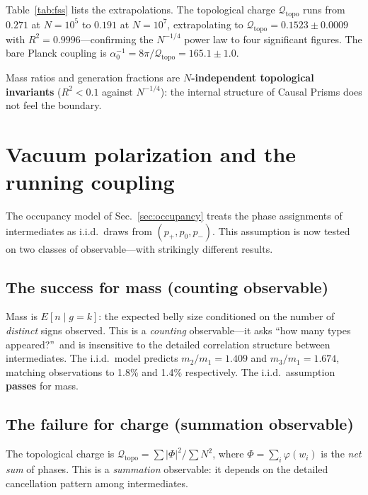 \documentclass[aps,prd,twocolumn,superscriptaddress,nofootinbib,amsmath,amssymb,longbibliography]{revtex4-2}
\newcommand{\Qtopo}{\mathcal{Q}_{\mathrm{topo}}}
\begin{document}
Table~\ref{tab:fss} lists the extrapolations.
The topological charge $\Qtopo$ runs from $0.271$ at $N = 10^5$ to
$0.191$ at $N = 10^7$, extrapolating to
$\Qtopo = 0.1523 \pm 0.0009$ with $R^2 = 0.9996$---confirming the
$N^{-1/4}$ power law to four significant figures.
The bare Planck coupling is
$\alpha_0^{-1} = 8\pi/\Qtopo = 165.1 \pm 1.0$.

Mass ratios and generation fractions are
\textbf{$N$-independent topological invariants} ($R^2 < 0.1$ against
$N^{-1/4}$): the internal structure of Causal Prisms does not feel the
boundary.



\section{Vacuum polarization and the running coupling}\label{sec:vp}

The occupancy model of Sec.~\ref{sec:occupancy} treats the phase
assignments of intermediates as i.i.d.\ draws from
$(p_+, p_0, p_-)$.  This assumption is now tested on two classes of
observable---with strikingly different results.

\subsection{The success for mass (counting observable)}

Mass is $E[n \mid g = k]$: the expected belly size conditioned on
the number of \emph{distinct} signs observed.  This is a \emph{counting}
observable---it asks ``how many types appeared?''\ and is insensitive to
the detailed correlation structure between intermediates.
The i.i.d.\ model predicts $m_2/m_1 = 1.409$ and $m_3/m_1 = 1.674$,
matching observations to 1.8\% and 1.4\% respectively.  The i.i.d.\
assumption \textbf{passes} for mass.

\subsection{The failure for charge (summation observable)}

The topological charge is
$\Qtopo = \sum|\Phi|^2/\sum N^2$, where $\Phi = \sum_i \varphi(w_i)$
is the \emph{net sum} of phases.
This is a \emph{summation} observable: it depends on the detailed
cancellation pattern among intermediates.
\end{document}
